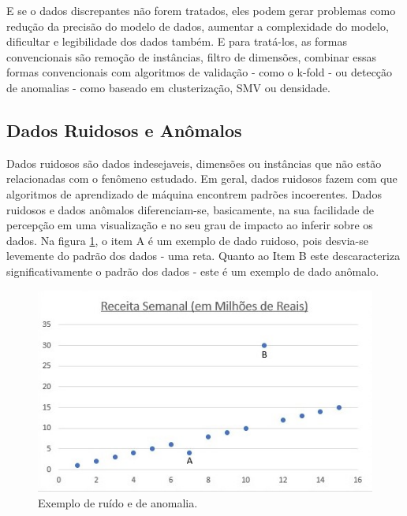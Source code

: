 \documentclass[
	12pt,				%
	openright,			%
	twoside,			%
	a4paper,			%
	english,			%
	brazil				%
	]{abntex2}
\begin{document}
		E se o dados discrepantes não forem tratados, eles podem gerar problemas como 
		redução da precisão do modelo de dados,
		aumentar a complexidade do modelo,
		dificultar e legibilidade dos dados também. \cite{Aggarwal2012} \cite{rathi_2019}
		E para tratá-los, as formas convencionais são 
		remoção de instâncias,
		filtro de dimensões,
		combinar essas formas convencionais com algoritmos de validação - como o k-fold - ou
		detecção de anomalias - como baseado em clusterização, SMV ou densidade.
	
		\subsection{Dados Ruidosos e Anômalos}
			Dados ruidosos são dados indesejaveis, dimensões ou instâncias que não estão relacionadas com o fenômeno estudado. \cite{rathi_2019}
			Em geral, dados ruidosos fazem com que algoritmos de aprendizado de máquina encontrem padrões incoerentes. \cite{rathi_2019}
			Dados ruidosos e dados anômalos diferenciam-se, basicamente, na sua facilidade de percepção em uma visualização e no seu grau de impacto ao inferir sobre os dados.
			Na figura \ref{fig:ruidoAnomalo}, o item A é um exemplo de dado ruidoso, pois desvia-se levemente do padrão dos dados - uma reta.
			Quanto ao Item B este descaracteriza significativamente o padrão dos dados - este é um exemplo de dado anômalo.
			\begin{figure}[h!]
				\centering
				\includegraphics[width=\linewidth]{./figures/FundamentacaoTeorica/ExemploRuidoAnomalo.jpg}
				\caption{Exemplo de ruído e de anomalia.}
				\label{fig:ruidoAnomalo}
			\end{figure}
			\par
			
\end{document}
